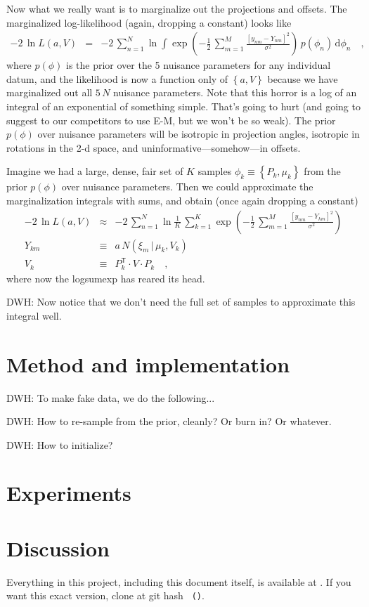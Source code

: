 \documentclass[12pt]{article}
\newcommand{\normal}{N}
\newcommand{\transpose}{^{\mathsf{T}}}
\newcommand{\given}{\,|\,}
\newcommand{\like}{L}
\newcommand{\setof}[1]{\left\{{#1}\right\}}
\newcommand{\dd}{\mathrm{d}}
\begin{document}
Now what we really want is to marginalize out the projections and
offsets.
The marginalized log-likelihood (again, dropping a constant) looks like
\begin{eqnarray}
  -2\,\ln\like(a,V) &=& -2\,\sum_{n=1}^N\ln\int\exp(-\frac{1}{2}\,\sum_{m=1}^M \frac{[y_{nm} - Y_{nm}]^2}{\sigma^2})\,p(\phi_n)\,\dd\phi_n
  \quad,
\end{eqnarray}
where $p(\phi)$ is the prior over the 5 nuisance parameters for any
individual datum, and the likelihood is now a function only of
$\setof{a,V}$ because we have marginalized out all $5\,N$ nuisance
parameters.
Note that this horror is a log of an integral of an exponential of
something simple.
That's going to hurt (and going to suggest to our competitors to use
E-M, but we won't be so weak).
The prior $p(\phi)$ over nuisance parameters will be isotropic in
projection angles, isotropic in rotations in the 2-d space, and
uninformative---somehow---in offsets.

Imagine we had a large, dense, fair set of $K$ samples
$\phi_k\equiv\setof{P_k, \mu_k}$ from the prior $p(\phi)$ over
nuisance parameters.
Then we could approximate the marginalization integrals with sums, and
obtain (once again dropping a constant)
\begin{eqnarray}
  -2\,\ln\like(a,V) &\approx& -2\,\sum_{n=1}^N\ln\frac{1}{K}\,\sum_{k=1}^K\exp(-\frac{1}{2}\,\sum_{m=1}^M \frac{[y_{nm} - Y_{km}]^2}{\sigma^2})
  \\
  Y_{km} &\equiv& a\,\normal(\xi_m\given\mu_k,V_k)
  \\
  V_k &\equiv& P_k\transpose\cdot V\cdot P_k
  \quad,
\end{eqnarray}
where now the logsumexp has reared its head.

DWH: Now notice that we don't need the full set of samples to
approximate this integral well.

\section{Method and implementation}

DWH: To make fake data, we do the following...

DWH: How to re-sample from the prior, cleanly?  Or burn in?  Or whatever.

DWH: How to initialize?

\section{Experiments}

\section{Discussion}


\bigskip

Everything in this project, including this document itself, is
available at \giturl.  If you want this exact version, clone at git
hash \texttt{\githash~(\gitdate)}.
\end{document}
